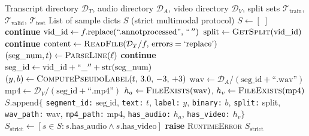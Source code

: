 \documentclass[12pt,a4paper]{article}
\theoremstyle{plain}
\theoremstyle{definition}
\begin{document}
\begin{algorithm}[H]
\caption{\texttt{build\_samples()} — Main Sample Construction}
\label{alg:build_samples}
\begin{algorithmic}[1]
\Require Transcript directory $\mathcal{D}_T$,
         audio directory $\mathcal{D}_A$,
         video directory $\mathcal{D}_V$,
         split sets $\mathcal{T}_\text{train}$,
         $\mathcal{T}_\text{valid}$, $\mathcal{T}_\text{test}$
\Ensure  List of sample dicts $S$ (strict multimodal protocol)
\State $S \gets [\;]$
    \State \textbf{continue}
  \EndIf
  \State $\text{vid\_id} \gets f.\text{replace}(\text{``.annotprocessed''},\, ``\,'')$
  \State $\text{split} \gets \textsc{GetSplit}(\text{vid\_id})$
    \State \textbf{continue}
  \EndIf
  \State $\text{content} \gets \textsc{ReadFile}(\mathcal{D}_T/f,\,
         \text{errors}=\text{`replace'})$
    \State $(\text{seg\_num}, t) \gets
           \textsc{ParseLine}(\ell)$
      \State \textbf{continue}
    \EndIf
    \State $\text{seg\_id} \gets
           \text{vid\_id} + ``\_'' + \text{str(seg\_num)}$
    \State $(y, b) \gets \textsc{ComputePseudoLabel}(t,\, 3.0,\, -3,\,+3)$
    \State $\text{wav} \gets \mathcal{D}_A /
           (\text{seg\_id} + \text{``.wav''})$
    \State $\text{mp4} \gets \mathcal{D}_V /
           (\text{seg\_id} + \text{``.mp4''})$
    \State $h_a \gets \textsc{FileExists}(\text{wav})$,\quad
           $h_v \gets \textsc{FileExists}(\text{mp4})$
    \State $S.\text{append}\bigl\{$
           \texttt{segment\_id:} $\text{seg\_id}$,
           \texttt{text:} $t$,
           \texttt{label:} $y$,
           \texttt{binary:} $b$,
           \texttt{split:} split,
           \texttt{wav\_path:} wav,
           \texttt{mp4\_path:} mp4,
           \texttt{has\_audio:} $h_a$,
           \texttt{has\_video:} $h_v\bigr\}$
  \EndFor
\EndFor
\State $S_{\text{strict}} \gets [s \in S : s.\text{has\_audio}
        \land s.\text{has\_video}]$
  \State \textbf{raise} \textsc{RuntimeError}
\EndIf
\State \Return $S_{\text{strict}}$
\end{algorithmic}
\end{algorithm}
\end{document}
